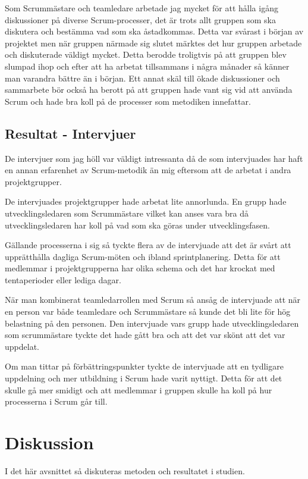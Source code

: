 Som Scrummästare och teamledare arbetade jag mycket för att hålla igång diskussioner på diverse Scrum-processer, det är trots allt gruppen som ska diskutera och bestämma vad som ska åstadkommas. 
Detta var svårast i början av projektet men när gruppen närmade sig slutet märktes det hur gruppen arbetade och diskuterade väldigt mycket. 
Detta berodde troligtvis på att gruppen blev slumpad ihop och efter att ha arbetat tillsammans i några månader så känner man varandra bättre än i början. 
Ett annat skäl till ökade diskussioner och sammarbete bör också ha berott på att gruppen hade vant sig vid att använda Scrum och hade bra koll på de processer som metodiken innefattar.

\subsection{Resultat - Intervjuer}
De intervjuer som jag höll var väldigt intressanta då de som intervjuades har haft en annan erfarenhet av Scrum-metodik än mig eftersom att de arbetat i andra projektgrupper. 

De intervjuades projektgrupper hade arbetat lite annorlunda. En grupp hade utvecklingsledaren som Scrummästare vilket kan anses vara bra då utvecklingsledaren har koll på vad som ska göras under utvecklingsfasen.

Gällande processerna i sig så tyckte flera av de intervjuade att det är svårt att upprätthålla dagliga Scrum-möten och ibland sprintplanering. Detta för att medlemmar i projektgrupperna har olika schema och det har krockat med tentaperioder eller lediga dagar.

När man kombinerat teamledarrollen med Scrum så ansåg de intervjuade att när en person var både teamledare och Scrummästare så kunde det bli lite för hög belastning på den personen. 
Den intervjuade vars grupp hade utvecklingsledaren som scrummästare tyckte det hade gått bra och att det var skönt att det var uppdelat.

Om man tittar på förbättringspunkter tyckte de intervjuade att en tydligare uppdelning och mer utbildning i Scrum hade varit nyttigt. Detta för att det skulle gå mer smidigt och att medlemmar i gruppen skulle ha koll på hur processerna i Scrum går till.

\section{Diskussion}
I det här avsnittet så diskuteras metoden och resultatet i studien.


